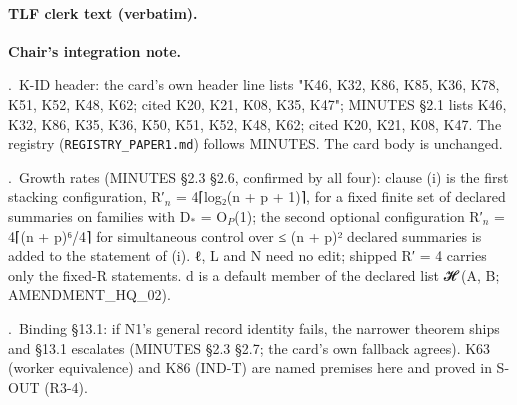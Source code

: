 \paragraph{TLF clerk text (verbatim).}
\par\noindent \textbf{Chair's integration note.}
\par{}.~K-ID header: the card's own header line lists "K46, K32, K86, K85, K36, K78, K51, K52, K48, K62; cited K20, K21, K08, K35, K47"; MINUTES §2.1 lists K46, K32, K86, K35, K36, K50, K51, K52, K48, K62; cited K20, K21, K08, K47. The registry (\texttt{REGISTRY\_PAPER1.md}) follows MINUTES. The card body is unchanged.
\par{}.~Growth rates (MINUTES §2.3 §2.6, confirmed by all four): clause (i) is the first stacking configuration, R′$_{n}$ = 4⌈log₂(n + p + 1)⌉, for a fixed finite set of declared summaries on families with D$_{*}$ = O$_{P}$(1); the second optional configuration R′$_{n}$ = 4⌈(n + p)⁶/4⌉ for simultaneous control over ≤ (n + p)² declared summaries is added to the statement of (i). ℓ, L and N need no edit; shipped R′ = 4 carries only the fixed-R statements. d is a default member of the declared list 𝓗 (A, B; AMENDMENT\_HQ\_02).
\par{}.~Binding §13.1: if N1's general record identity fails, the narrower theorem ships and §13.1 escalates (MINUTES §2.3 §2.7; the card's own fallback agrees). K63 (worker equivalence) and K86 (IND-T) are named premises here and proved in S-OUT (R3-4).

